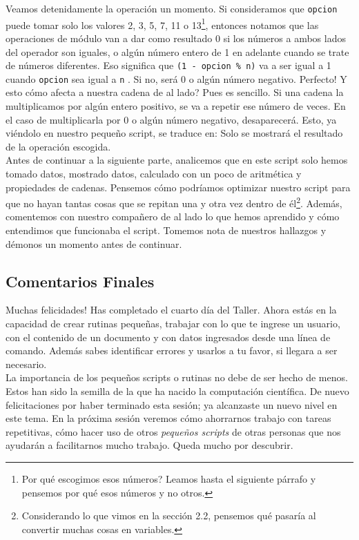 \documentclass[10pt,letterpaper]{article}
\newcommand{\inlinecode}[1]{
\colorbox{light-gray}{\texttt{#1}}
}
\begin{document}
Veamos detenidamente la operaci\'on un momento. Si consideramos que \inlinecode{opcion} puede tomar solo los valores 2, 3, 5, 7, 11 o 13\footnote{Por qu\'e escogimos esos n\'umeros? Leamos hasta el siguiente p\'arrafo y pensemos por qu\'e esos n\'umeros y no otros.}, entonces notamos que las operaciones de m\'odulo van a dar como resultado 0 si los n\'umeros a ambos lados del operador son iguales, o alg\'un n\'umero entero de 1 en adelante cuando se trate de n\'umeros diferentes. Eso significa que \inlinecode{(1 - opcion \% n)} va a ser igual a 1 cuando \inlinecode{opcion} sea igual a \inlinecode{n}. Si no, ser\'a 0 o alg\'un n\'umero negativo. Perfecto! Y esto c\'omo afecta a nuestra cadena de al lado? Pues es sencillo. Si una cadena la multiplicamos por alg\'un entero positivo, se va a repetir ese n\'umero de veces. En el caso de multiplicarla por 0 o alg\'un n\'umero negativo, desaparecer\'a. Esto, ya vi\'endolo en nuestro peque\~no script, se traduce en: Solo se mostrar\'a el resultado de la operaci\'on escogida.\\

Antes de continuar a la siguiente parte, analicemos que en este script solo hemos tomado datos, mostrado datos, calculado con un poco de aritm\'etica y propiedades de cadenas. Pensemos c\'omo podr\'iamos optimizar nuestro script para que no hayan tantas cosas que se repitan una y otra vez dentro de \'el\footnote{Considerando lo que vimos en la secci\'on 2.2, pensemos qu\'e pasar\'ia al convertir muchas cosas en variables.}. Adem\'as, comentemos con nuestro compa\~nero de al lado lo que hemos aprendido y c\'omo entendimos que funcionaba el script. Tomemos nota de nuestros hallazgos y d\'emonos un momento antes de continuar.

\newpage

\subsection{Comentarios Finales}
Muchas felicidades! Has completado el cuarto d\'ia del Taller. Ahora est\'as en la capacidad de crear rutinas peque\~nas, trabajar con lo que te ingrese un usuario, con el contenido de un documento y con datos ingresados desde una l\'inea de comando. Adem\'as sabes identificar errores y usarlos a tu favor, si llegara a ser necesario.\\

La importancia de los peque\~nos scripts o rutinas no debe de ser hecho de menos. Estos han sido la semilla de la que ha nacido la computaci\'on cient\'ifica. De nuevo felicitaciones por haber terminado esta sesi\'on; ya alcanzaste un nuevo nivel en este tema. En la pr\'oxima sesi\'on veremos c\'omo ahorrarnos trabajo con tareas repetitivas, c\'omo hacer uso de otros \emph{peque\~nos scripts} de otras personas que nos ayudar\'an a facilitarnos mucho trabajo. Queda mucho por descubrir.
\end{document}
